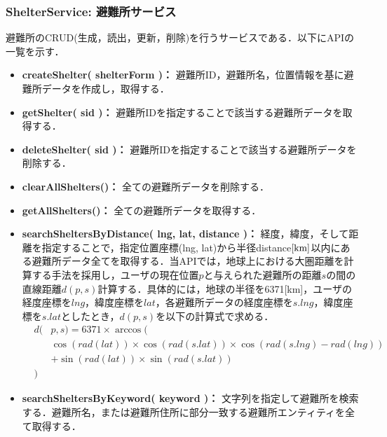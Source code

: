 \documentclass[technicalreport,dvipdfmx]{ieicej}
\begin{document}
\subsubsection{{\bf ShelterService:} 避難所サービス}
避難所のCRUD(生成，読出，更新，削除)を行うサービスである．以下にAPIの一覧を示す．
\begin{itemize}
    \item{\textbf{createShelter( shelterForm )：}
         避難所ID，避難所名，位置情報を基に避難所データを作成し，取得する．}
    \item{\textbf{getShelter( sid )：}
         避難所IDを指定することで該当する避難所データを取得する．}
    \item{\textbf{deleteShelter( sid )：}
         避難所IDを指定することで該当する避難所データを削除する．}
    \item{\textbf{clearAllShelters()：}
         全ての避難所データを削除する．}
    \item{\textbf{getAllShelters()：}
         全ての避難所データを取得する．}
    \item{\textbf{searchSheltersByDistance( lng, lat, distance )：}
         経度，緯度，そして距離を指定することで，指定位置座標(lng, lat)から半径distance$\rm[km]$以内にある避難所データ全てを取得する．当APIでは，地球上における大圏距離を計算する手法を採用し，ユーザの現在位置$p$と与えられた避難所の距離$s$の間の直線距離$d(p,s)$計算する．具体的には，地球の半径を6371[km]，ユーザの経度座標を$lng$，緯度座標を$lat$，各避難所データの経度座標を$s.lng$，緯度座標を$s.lat$としたとき，$d(p,s)$を以下の計算式で求める．
         \begin{eqnarray*}
          &d(&p,s) = 6371 \times \arccos (\\
          & &\cos( rad(lat ) ) \times \cos( rad( s.lat ) ) 
          \times \cos( rad( s.lng ) - rad(lng ) ) \\
          & & +  \sin( rad( lat ) ) \times \sin( rad( s.lat ))\\
          &)&
         \end{eqnarray*}}
    \item{\textbf{searchSheltersByKeyword( keyword )：}
         文字列を指定して避難所を検索する．避難所名，または避難所住所に部分一致する避難所エンティティを全て取得する．}
\end{itemize}
\end{document}

